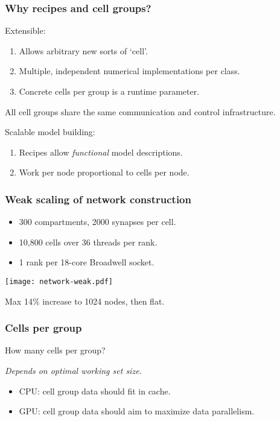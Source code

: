\documentclass[aspectratio=43,12pt]{beamer}
\begin{document}
\begin{frame}
\frametitle{Why recipes and cell groups?}

Extensible:
\begin{enumerate}
\item Allows arbitrary new sorts of `cell'.
\item Multiple, independent numerical implementations per class.
\item Concrete cells per group is a runtime parameter.
\end{enumerate}


All cell groups share the same communication and control infrastructure.

\vfill
Scalable model building:
\begin{enumerate}
\item Recipes allow \textit{functional} model descriptions.
\item Work per node proportional to cells per node.
\end{enumerate}
\vfill
\end{frame}

\begin{frame}
\frametitle{Weak scaling of network construction}
\begin{itemize}
\item
300 compartments, 2000 synapses per cell.
\item
10,800 cells over 36 threads per rank.
\item
1 rank per 18-core Broadwell socket.
\end{itemize}

\texttt{[image: network-weak.pdf]}
\vfill

\centering
Max 14\% increase to 1024 nodes, then flat.
\vfill
\end{frame}

\begin{frame}
\frametitle{Cells per group}

How many cells per group?

\pause
\hspace{4cm} \textit{Depends on optimal working set size.}
\vfill
\begin{itemize}
\item CPU: cell group data should fit in cache.
\item GPU: cell group data should aim to maximize data parallelism.
\end{itemize}
\end{frame}
\end{document}
